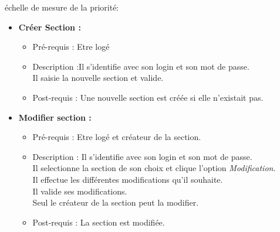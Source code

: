 \begin{center}
{\'e}chelle de mesure de la priorit{\'e}:

\end{center}

\begin{itemize}
\item  {\bf Cr{\'e}er Section :}
	\begin{itemize}
	\item Pr{\'e}-requis : Etre log{\'e} 
	\item Description :Il s'identifie avec son login et son mot de passe. \\
	Il saisie la nouvelle section et valide.
	\item Post-requis : Une nouvelle section est cr{\'e}{\'e}e si elle n'existait pas.
	\end{itemize}

\item  {\bf Modifier section :}
	\begin{itemize}
	\item Pr{\'e}-requis : Etre log{\'e} et cr{\'e}ateur de la section.
	\item Description : Il s'identifie avec son login et son mot de passe.\\
	Il selectionne la section de son choix et clique l'option {\it Modification}.\\
	Il effectue les diff{\'e}rentes modifications qu'il souhaite.\\
	Il valide ses modifications.\\
	Seul le cr{\'e}ateur de la section peut la modifier.
	\item Post-requis : La section est modifi{\'e}e.
	\end{itemize}


\end{itemize}
